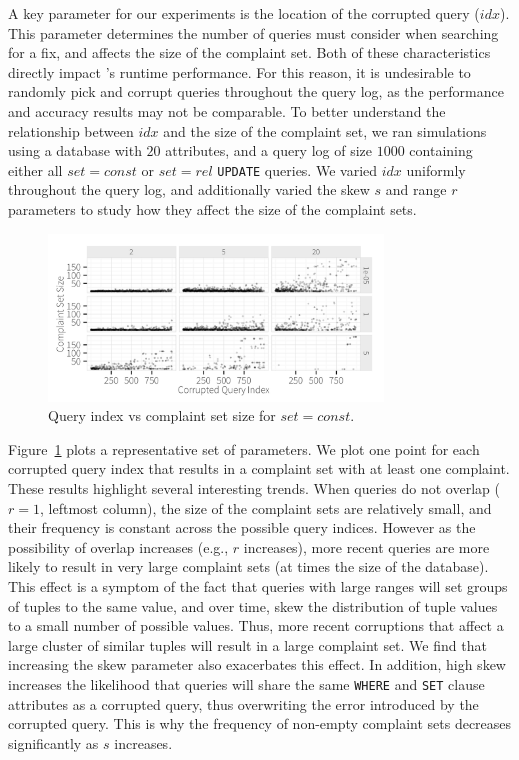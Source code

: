 {
A key parameter for our experiments is the location of the corrupted query ($idx$).  
This parameter determines the number of queries \sys must consider when searching for a fix,
and affects the size of the complaint set.  
Both of these characteristics directly impact \sys's 
runtime performance. For this reason, it is undesirable to randomly pick and corrupt queries
throughout the query log, as the performance and accuracy results may not be comparable. 
To better understand the relationship between $idx$ and the size of the complaint set, we ran
simulations using a database with $20$ attributes, and a query log of size $1000$ containing
either all $set = const$ or $set = rel$ \texttt{UPDATE} queries.
We varied  $idx$ uniformly throughout the query log, and additionally varied
the skew $s$ and range $r$ parameters to study how they affect the size of the complaint sets.


  \begin{figure}[h]
  \centering
  \includegraphics[width = 3.5in]{figures/qidxsimulation/qidx_v_ncomplaints_20attrs_const}
  \caption{Query index vs complaint set size for $set = const$.}
  \label{f:qidx_v_ncomplaints_const} 
  \end{figure}


Figure~\ref{f:qidx_v_ncomplaints_const} plots a representative set of parameters.  We plot one point
for each corrupted query index that results in a complaint set with at least one complaint. 
These results highlight several interesting trends.  When queries do not overlap ($r = 1$, leftmost column),
the size of the complaint sets are relatively small, and their frequency is constant across the possible query indices.
However as the possibility of overlap increases (e.g., $r$ increases), more recent queries are more likely to result in
very large complaint sets (at times the size of the database).   
This effect is a symptom of the fact that queries with large ranges will set groups of tuples to the same value,
and over time, skew the distribution of tuple values to a small number of possible values.
Thus, more recent corruptions that affect a large cluster of similar tuples will result in a large complaint set.
We find that increasing the skew parameter also exacerbates this effect.  
In addition, high skew increases the likelihood that queries will share the same \texttt{WHERE} and \texttt{SET} clause 
attributes as a corrupted query, thus overwriting the error introduced by the corrupted query.  
This is why the frequency of non-empty complaint sets decreases significantly as $s$ increases.


}
